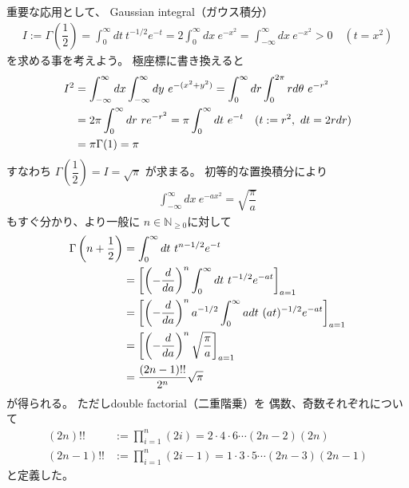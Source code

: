 重要な応用として、
Gaussian integral（ガウス積分）
\begin{align}
    I :=
    \Gamma\left(\dfrac{1}{2}\right)
    =
    \int_{0}^{\infty} dt\ t^{-1/2}e^{-t}
    =
    2
    \int_{0}^{\infty} dx\ e^{-x^2}
    =
    \int_{-\infty}^{\infty} dx\ e^{-x^2}
    > 0
    \quad(t=x^2)
\end{align}
を求める事を考えよう。
極座標に書き換えると
\begin{align}
    I^2 &=
    \int_{-\infty}^{\infty} dx
    \int_{-\infty}^{\infty} dy
    \ 
        e^{-(x^2 + y^2)}
=
    \int_0^{\infty} dr
    \int_0^{2\pi} r d\theta
    \ 
        e^{-r^2}
\notag\\&=
    2 \pi
    \int_0^{\infty} dr
    \ r 
        e^{-r^2}
=
    \pi
    \int_0^{\infty} dt\ e^{-t}
    \quad(t:=r^2,\ dt = 2 r dr)
\notag\\&=
    \pi\Gamma(1)
    = \pi
\end{align}
すなわち
$\Gamma\left(\dfrac{1}{2}\right)
= I = \sqrt{\pi}$
が求まる。
初等的な置換積分により
\begin{align}
    \int_{-\infty}^{\infty} dx\ e^{-ax^2}
    =
    \sqrt{
        \dfrac{\pi}{a}
    }
\label{gaussian integral}
\end{align}
もすぐ分かり、より一般に
$n \in \mathbb{N}_{\ge0}$に対して
\begin{align}
    \Gamma\left( n + \dfrac{1}{2} \right)
    &=
    \int_0^\infty dt\ t^{n-1/2} e^{-t}
\notag\\&=
    \left[
        \left(
            -
            \dfrac{d}{da}
        \right)^n
        \int_0^\infty dt\ t^{-1/2} e^{-at}
    \right]_{a=1}
\notag\\&=
    \left[
    \left(
        -
        \dfrac{d}{da}
    \right)^n
        a^{-1/2}
        \int_0^\infty a dt\ (at)^{-1/2} e^{-at}
    \right]_{a=1}
\notag\\&=
    \left[
    \left(
        -
        \dfrac{d}{da}
    \right)^n
    \sqrt{
        \dfrac{\pi}{a}
    }
    \right]_{a=1}
\notag\\&=
    \dfrac{(2n-1)!!}{2^{n}}\sqrt{\pi}
\label{Gamma function at half integer}
\end{align}
が得られる。
ただしdouble factorial（二重階乗）を
偶数、奇数それぞれについて
\begin{subequations}
\begin{align}
    (2n)!!
    &:=
    \prod_{i=1}^n (2i)
    =2\cdot4\cdot6\cdots(2n-2)(2n)
\\
    (2n-1)!!
    &:=
    \prod_{i=1}^n (2i-1)
    =
    1\cdot3\cdot5\cdots(2n-3)(2n-1)
\end{align}
\end{subequations}
と定義した。


